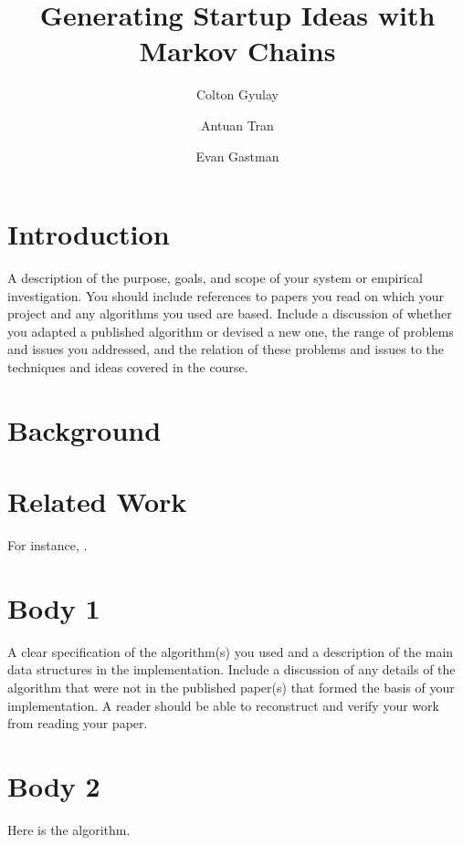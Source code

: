 \documentclass[11pt]{article}
\title{Generating Startup Ideas with Markov Chains}
\author{Colton Gyulay \and Antuan Tran \and Evan Gastman}
\begin{document}
\maketitle{}


\section{Introduction}

A description of the purpose, goals, and scope of your system or
empirical investigation.  You should include references to papers you
read on which your project and any algorithms you used are
based. Include a discussion of whether you adapted a published
algorithm or devised a new one, the range of problems and issues you
addressed, and the relation of these problems and issues to the
techniques and ideas covered in the course.

\section{Background}


\section{Related Work}

For instance, \cite{hochreiter1997long}.


\section{Body 1}

A clear specification of the algorithm(s) you used and a description
of the main data structures in the implementation. Include a
discussion of any details of the algorithm that were not in the
published paper(s) that formed the basis of your implementation. A
reader should be able to reconstruct and verify your work from reading
your paper.

\section{Body 2}


\begin{algorithm}
  \begin{algorithmic}
    \EndProcedure{}
  \end{algorithmic}
  \caption{Here is the algorithm.}
\end{algorithm}
\end{document}
